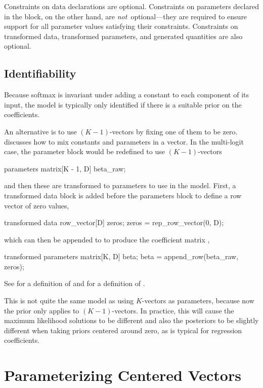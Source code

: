 Constraints on data declarations are optional.  Constraints on
parameters declared in the  block, on the other hand,
are {\it not}\ optional---they are required to ensure support for all
parameter values satisfying their constraints.  Constraints on
transformed data, transformed parameters, and generated quantities are
also optional.

\subsection{Identifiability}

Because softmax is invariant under adding a constant to each component
of its input, the model is typically only identified if there is a
suitable prior on the coefficients.

An alternative is to use $(K-1)$-vectors by fixing one of them to be
zero.  discusses how to mix 
constants and parameters in a vector.  In the multi-logit case, the
parameter block would be redefined to use $(K-1)$-vectors
%
\begin{stancode}
parameters {
  matrix[K - 1, D] beta_raw;
}
\end{stancode}
%
and then these are transformed to parameters to use in the model.
First, a transformed data block is added before the parameters block
to define a row vector of zero values,
%
\begin{stancode}
transformed data {
  row_vector[D] zeros;
  zeros = rep_row_vector(0, D);
}
\end{stancode}
%
which can then be appended to  to produce the
coefficient matrix ,
%
\begin{stancode}
transformed parameters {
  matrix[K, D] beta;
  beta = append_row(beta_raw, zeros);
}
\end{stancode}
%
See  for a definition of
 and  for a
definition of .

This is not quite the same model as using $K$-vectors as parameters,
because now the prior only applies to $(K-1)$-vectors.  In practice,
this will cause the maximum likelihood solutions to be different and
also the posteriors to be slightly different when taking priors
centered around zero, as is typical for regression coefficients.

\section{Parameterizing Centered Vectors}

